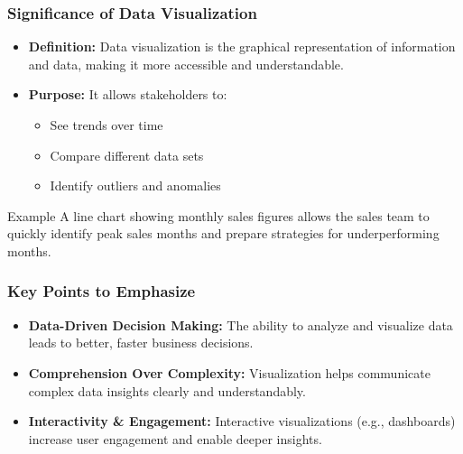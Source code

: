 \documentclass{beamer}
\begin{document}
\begin{frame}[fragile]
    \frametitle{Significance of Data Visualization}
    \begin{itemize}
        \item \textbf{Definition:} Data visualization is the graphical representation of information and data, making it more accessible and understandable.
        \item \textbf{Purpose:} It allows stakeholders to:
        \begin{itemize}
            \item See trends over time
            \item Compare different data sets
            \item Identify outliers and anomalies
        \end{itemize}
    \end{itemize}
    \begin{block}{Example}
        A line chart showing monthly sales figures allows the sales team to quickly identify peak sales months and prepare strategies for underperforming months.
    \end{block}
\end{frame}

\begin{frame}[fragile]
    \frametitle{Key Points to Emphasize}
    \begin{itemize}
        \item \textbf{Data-Driven Decision Making:} The ability to analyze and visualize data leads to better, faster business decisions.
        \item \textbf{Comprehension Over Complexity:} Visualization helps communicate complex data insights clearly and understandably.
        \item \textbf{Interactivity \& Engagement:} Interactive visualizations (e.g., dashboards) increase user engagement and enable deeper insights.
    \end{itemize}
\end{frame}
\end{document}
